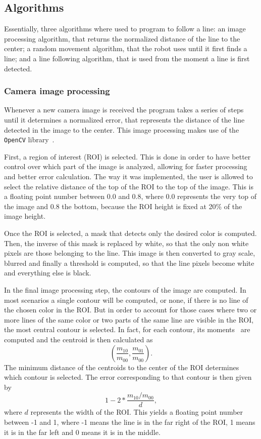 \documentclass[10pt,conference,compsoc]{IEEEtran}
\begin{document}
\subsection{Algorithms}

Essentially, three algorithms where used to program \robobo to follow a line: an image processing algorithm, that returns the normalized distance of the line to the center; a random movement algorithm, that the robot uses until it first finds a line; and a line following algorithm, that is used from the moment a line is first detected.

\subsubsection{Camera image processing}

Whenever a new camera image is received the program takes a series of steps until it determines a normalized error, that represents the distance of the line detected in the image to the center. This image processing makes use of the \texttt{OpenCV} library~\cite{OpenCV}.

First, a region of interest (ROI) is selected. This is done in order to have better control over which part of the image is analyzed, allowing for faster processing and better error calculation. The way it was implemented, the user is allowed to select the relative distance of the top of the ROI to the top of the image. This is a floating point number between 0.0 and 0.8, where 0.0 represents the very top of the image and 0.8 the bottom, because the ROI height is fixed at 20\% of the image height.

Once the ROI is selected, a mask that detects only the desired color is computed. Then, the inverse of this mask is replaced by white, so that the only non white pixels are those belonging to the line. This image is then converted to gray scale, blurred and finally a threshold is computed, so that the line pixels become white and everything else is black.

In the final image processing step, the contours of the image are computed. In most scenarios a single contour will be computed, or none, if there is no line of the chosen color in the ROI. But in order to account for those cases where two or more lines of the same color or two parts of the same line are visible in the ROI, the most central contour is selected. In fact, for each contour, its moments~\cite{moments_wiki} are computed and the centroid is then calculated as $$\left(\frac{m_{10}}{m_{00}}, \frac{m_{01}}{m_{00}}\right).$$ The minimum distance of the centroids to the center of the ROI determines which contour is selected. The error corresponding to that contour is then given by $$1 - 2 * \frac{m_{10}/m_{00}}{d},$$ where $d$ represents the width of the ROI. This yields a floating point number between -1 and 1, where -1 means the line is in the far right of the ROI, 1 means it is in the far left and 0 means it is in the middle.
\end{document}
